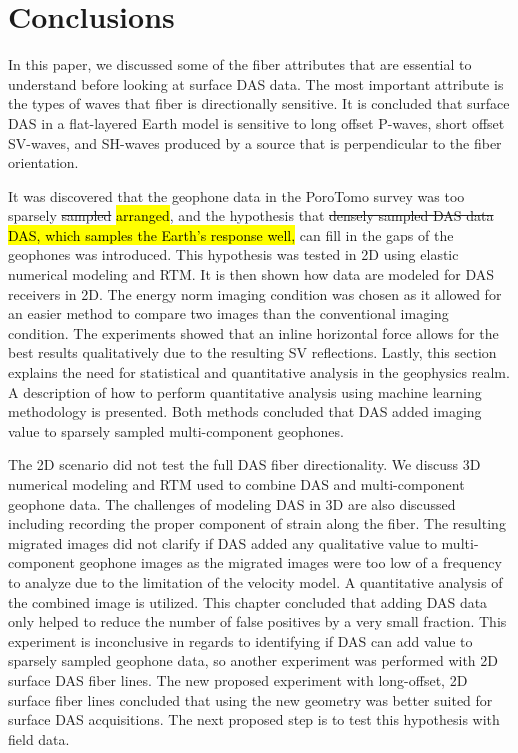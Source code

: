 \section{Conclusions}
In this paper, we discussed some of the fiber attributes that are essential to understand before looking at surface DAS data. The most important attribute is the types of waves that fiber is directionally sensitive. It is concluded that surface DAS in a flat-layered Earth model is sensitive to long offset P-waves, short offset SV-waves, and SH-waves produced by a source that is perpendicular to the fiber orientation.

It was discovered that the geophone data in the PoroTomo survey was too sparsely \sout{sampled} \hl{arranged}, and the hypothesis that \sout{densely sampled DAS data} \hl{DAS, which samples the Earth's response well,} can fill in the gaps of the geophones was introduced. This hypothesis was tested in 2D using elastic numerical modeling and RTM. It is then shown how data are modeled for DAS receivers in 2D. The energy norm imaging condition was chosen as it allowed for an easier method to compare two images than the conventional imaging condition. The experiments showed that an inline horizontal force allows for the best results qualitatively due to the resulting SV reflections. Lastly, this section explains the need for statistical and quantitative analysis in the geophysics realm. A description of how to perform quantitative analysis using machine learning methodology is presented. Both methods concluded that DAS added imaging value to sparsely sampled multi-component geophones.

The 2D scenario did not test the full DAS fiber directionality. We discuss 3D numerical modeling and RTM used to combine DAS and multi-component geophone data. The challenges of modeling DAS in 3D are also discussed including recording the proper component of strain along the fiber. The resulting migrated images did not clarify if DAS added any qualitative value to multi-component geophone images as the migrated images were too low of a frequency to analyze due to the limitation of the velocity model. A quantitative analysis of the combined image is utilized. This chapter concluded that adding DAS data only helped to reduce the number of false positives by a very small fraction. This experiment is inconclusive in regards to identifying if DAS can add value to sparsely sampled geophone data, so another experiment was performed with 2D surface DAS fiber lines. The new proposed experiment with long-offset, 2D surface fiber lines concluded that using the new geometry was better suited for surface DAS acquisitions. The next proposed step is to test this hypothesis with field data.
